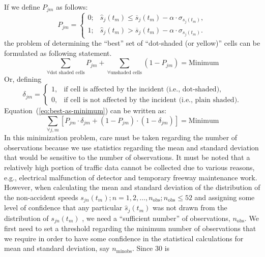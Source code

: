 \documentclass[12pt]{report}
\begin{document}
If we define $P_{jm}$ as follows:
\begin{equation}
  \label{eq:pjm}
  P_{jm} = 
  \begin{cases}
    0;& \hat{s}_j(t_m) \le \overline{s}_j(t_m) - \alpha\cdot\sigma_{s_j(t_m)},\\
    1;& \hat{s}_j(t_m) > \overline{s}_j(t_m) - \alpha\cdot\sigma_{s_j(t_m)}.
  \end{cases}
\end{equation}
the problem of determining the ``best'' set of ``dot-shaded (or yellow)'' cells can be
formulated as following statement.
\begin{equation}
  \label{eq:best-as-minimum}
  \sum\limits_{\forall\text{dot shaded cells}} P_{jm} + \sum\limits_{\forall\text{unshaded cells}} (1-P_{jm}) = \text{Minimum}
\end{equation}
Or, defining
\begin{equation*}
  \delta_{jm} =
  \begin{cases}
    1,& \text{if cell is affected by the incident (i.e., dot-shaded)},\\
    0,& \text{if cell is not affected by the incident (i.e., plain shaded)}.
  \end{cases} 
\end{equation*}
Equation~(\ref{eq:best-as-minimum}) can be written as:
\begin{equation}
  \label{eq:best-as-minimum-w-delta}
  \sum\limits_{\forall j,m}\left[P_{jm}\cdot\delta_{jm}+(1-P_{jm})\cdot(1-\delta_{jm})\right] = \text{Minimum}
\end{equation}
In this minimization problem, care must be taken regarding the number
of observations because we use statistics regarding the mean and
standard deviation that would be sensitive to the number of
observations. It must be noted that a relatively high portion of
traffic data cannot be collected due to various reasons, e.g.,
electrical malfunction of detector and temporary freeway maintenance
work. However, when calculating the mean and standard deviation of the
distribution of the non-accident speeds $s_{jn}(t_m); n = 1,
2,\ldots{}, n_{\mathrm{obs}}; n_{\mathrm{obs}} \le 52$ and assigning
some level of confidence that any particular $\hat{s}_j(t_m)$ was not
drawn from the distribution of $s_{jn}(t_m)$ , we need a ``sufficient
number'' of observations, $n_{\mathrm{obs}}$.  We first need to set a
threshold regarding the minimum number of observations that we require
in order to have some confidence in the statistical calculations for
mean and standard deviation, say $n_{\textrm{minobs}}$. Since 30 is
\end{document}
